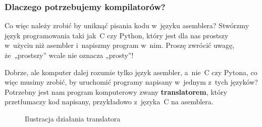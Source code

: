 \documentclass[10pt,t]{beamer}
\begin{document}
\begin{frame}
  \frametitle{Dlaczego potrzebujemy kompilatorów?}


  Co więc należy zrobić by uniknąć pisania kodu w~języku asemblera? Stwórzmy
  język programowania taki jak~C czy Python, który jest dla nas prostszy
  w~użyciu niż asembler i~napiszmy program w~nim. Proszę zwrócić uwagę,
  że~„prostszy” wcale nie oznacza \alert{„prosty”}!

  Dobrze, ale komputer dalej rozumie tylko język asembler, a~nie~C czy
  Pytona, co więc musimy zrobić, by uruchomić programy napisany w~jednym
  z~tych języków? Potrzebny jest nam program komputerowy zwany
  \textbf{translatorem}, który \alert{przetłumaczy} kod napisany,
  przykładowo z~języka~C na asemblera.





  \begin{figure}

    \label{fig:Translator-01}


    \caption{Ilustracja działania translatora}


  \end{figure}





\end{frame}
\end{document}
